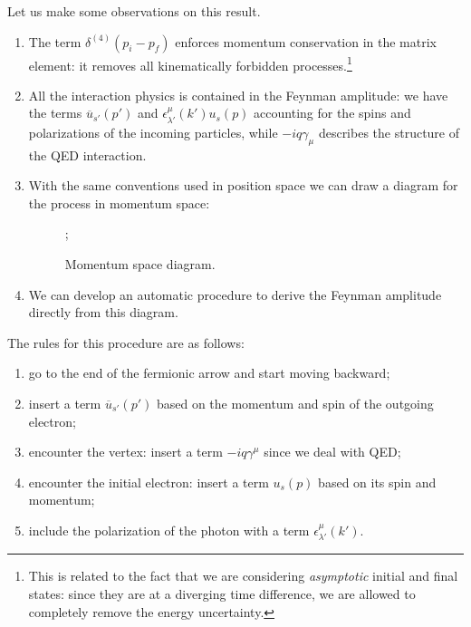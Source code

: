 \documentclass[main.tex]{subfiles}
\begin{document}
Let us make some observations on this result.

\begin{enumerate}
    \item The term \(\delta^{(4)}(p _{i} - p _{f})\) enforces momentum conservation in the matrix element: it removes all kinematically forbidden processes.\footnote{This is related to the fact that we are considering \emph{asymptotic} initial and final states: since they are at a diverging time difference, we are allowed to completely remove the energy uncertainty. }
    \item All the interaction physics is contained in the Feynman amplitude: we have the terms \(\overline{u}_{s'} (p')\) and \(\epsilon^{\mu }_{\lambda '} (k ') u_s (p)\) accounting for the spins and polarizations of the incoming particles, while \(-i q \gamma_{\mu }\) describes the structure of the QED interaction. 
    \item With the same conventions used in position space we can draw a diagram for the process in momentum space: 
    \begin{figure}[ht]
    \centering
    ;
    \caption{Momentum space diagram.}   
    \label{fig:eegamma-interaction}
    \end{figure}
    \item We can develop an automatic procedure to derive the Feynman amplitude directly from this diagram. 
\end{enumerate}

The rules for this procedure are as follows: 
\begin{enumerate}
    \item go to the end of the fermionic arrow and start moving backward;
    \item insert a term \(\overline{u}_{s'} (p')\) based on the momentum and spin of the outgoing electron; 
    \item encounter the vertex: insert a term \(-iq \gamma^{\mu }\) since we deal with QED;
    \item encounter the initial electron: insert a term \(u_s (p)\) based on its spin and momentum;
    \item include the polarization of the photon  with a term \(\epsilon^{\mu }_{\lambda '} (k')\).
\end{enumerate}
\end{document}

